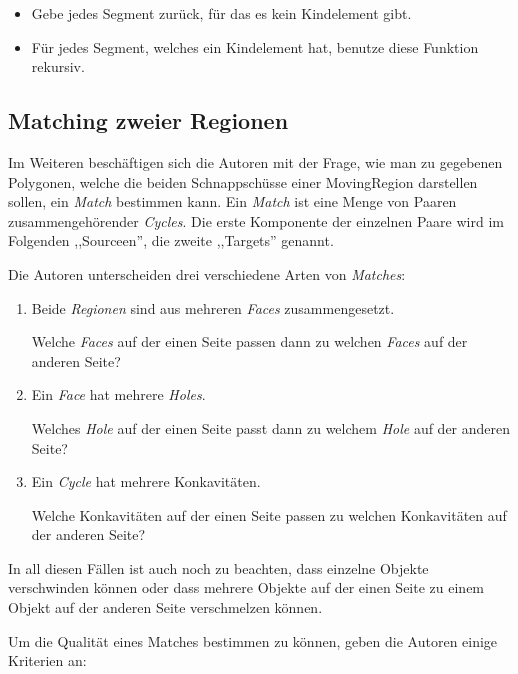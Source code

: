 \begin{itemize}
\item Gebe jedes Segment zurück, für das es kein Kindelement gibt.
\item Für jedes Segment, welches ein Kindelement hat, benutze diese Funktion rekursiv.
\end{itemize}

\subsection{Matching zweier Regionen}

Im Weiteren beschäftigen sich die Autoren mit der Frage, wie man zu gegebenen Polygonen, welche die beiden Schnappschüsse einer MovingRegion darstellen sollen, ein \textit{Match} bestimmen kann. Ein \textit{Match} ist eine Menge von Paaren zusammengehörender \textit{Cycles}. Die erste Komponente der einzelnen Paare wird im Folgenden ,,Sourceen'', die zweite ,,Targets'' genannt.

Die Autoren unterscheiden drei verschiedene Arten von \textit{Matches}:

\begin{enumerate}
\item Beide \textit{Regionen} sind aus mehreren \textit{Faces} zusammengesetzt.
 
Welche \textit{Faces} auf der einen Seite passen dann zu welchen \textit{Faces} auf der anderen Seite?
\item Ein \textit{Face} hat mehrere \textit{Holes}.
 
Welches \textit{Hole} auf der einen Seite passt dann zu welchem \textit{Hole} auf der anderen Seite?
\item Ein \textit{Cycle} hat mehrere Konkavitäten.
 
Welche Konkavitäten auf der einen Seite passen zu welchen Konkavitäten auf der anderen Seite?
\end{enumerate}

In all diesen Fällen ist auch noch zu beachten, dass einzelne Objekte verschwinden können oder dass mehrere Objekte auf der einen Seite zu einem Objekt auf der anderen Seite verschmelzen können.

Um die Qualität eines Matches bestimmen zu können, geben die Autoren einige Kriterien an:

